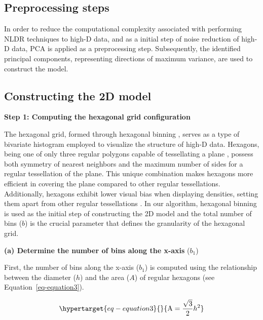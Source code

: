 \documentclass[
  12pt]{article}
\begin{document}
\hypertarget{preprocessing-steps}{%
\subsection{Preprocessing steps}\label{preprocessing-steps}}

In order to reduce the computational complexity associated with
performing NLDR techniques to high-D data, and as a initial step of
noise reduction of high-D data, PCA \citep[\citet{article68},
\citet{article69}]{article67} is applied as a preprocessing step.
Subsequently, the identified principal components, representing
directions of maximum variance, are used to construct the model.

\hypertarget{sec-construct2d}{%
\subsection{Constructing the 2D model}\label{sec-construct2d}}

\textbf{Step 1: Computing the hexagonal grid configuration}

The hexagonal grid, formed through hexagonal binning
\citep[\citet{article66}]{Carr1987}, serves as a type of bivariate
histogram employed to visualize the structure of high-D data. Hexagons,
being one of only three regular polygons capable of tessellating a plane
\citep{Carr2013}, possess both symmetry of nearest neighbors and the
maximum number of sides for a regular tessellation of the plane. This
unique combination makes hexagons more efficient in covering the plane
compared to other regular tessellations. Additionally, hexagons exhibit
lower visual bias when displaying densities, setting them apart from
other regular tessellations \citep{Dan2023}. In our algorithm, hexagonal
binning is used as the initial step of constructing the 2D model and the
total number of bins (\(b\)) is the crucial parameter that defines the
granularity of the hexagonal grid.

\textbf{(a) Determine the number of bins along the x-axis} (\(b_1\))

First, the number of bins along the x-axis (\(b_1\)) is computed using
the relationship between the diameter (\(h\)) and the area (\(A\)) of
regular hexagons (see Equation~\ref{eq-equation3}).

\begin{equation}\protect\hypertarget{eq-equation3}{}{
 \text{A} = \frac{\sqrt{3}}{2}h^2
}\label{eq-equation3}\end{equation}
\end{document}
